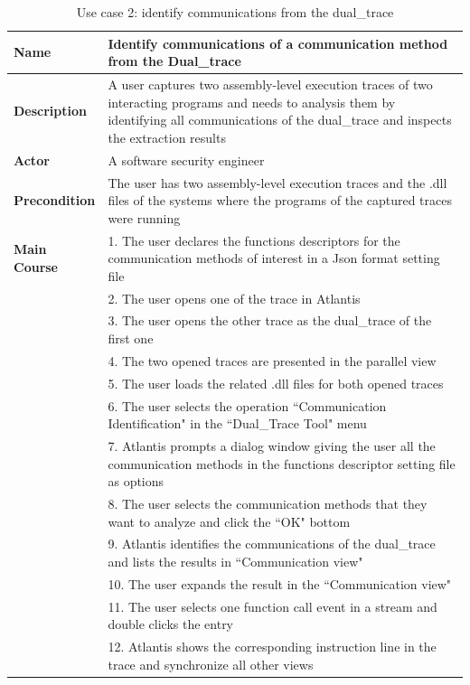 \documentclass[12pt,oneside]{book}
\begin{document}
\begin{table}[H]
  \centering
  \caption{Use case 2: identify communications from the dual\_trace}
  \label{usecase2}
  \begin{tabular}{|l|p{13cm}|}
      \hline
       \textbf{Name} & Identify communications of a communication method from the Dual\_trace\\
       \hline
       \textbf{Description} & A user captures two assembly-level execution traces of two interacting programs and needs to analysis them by identifying all communications of the dual\_trace and inspects the extraction results \\
       \hline
              \textbf{Actor} & A software security engineer \\
       \hline
      \textbf{Precondition} & The user has two assembly-level execution traces and the .dll files of the systems where the programs of the captured traces were running\\
       \hline
       \textbf{Main Course}& 1. The user declares the functions descriptors for the communication methods of interest in a Json format setting file\\
        & 2. The user opens one of the trace in Atlantis\\
       &  3. The user opens the other trace as the dual\_trace of the first one\\
       & 4. The two opened traces are presented in the parallel view\\
       & 5. The user loads the related .dll files for both opened traces\\
       & 6. The user selects the operation ``Communication Identification" in the ``Dual\_Trace Tool" menu\\
      & 7. Atlantis prompts a dialog window giving the user all the communication methods in the functions descriptor setting file as options\\
       & 8. The user selects the communication methods that they want to analyze and click the ``OK" bottom\\
       & 9. Atlantis identifies the communications of the dual\_trace and lists the results in ``Communication view"\\
       & 10. The user expands the result in the ``Communication view"\\
       & 11. The user selects one function call event in a stream and double clicks the entry\\
       & 12. Atlantis shows the corresponding instruction line in the trace and synchronize all other views\\
      \hline               
  \end{tabular}
\end{table}
\end{document}
